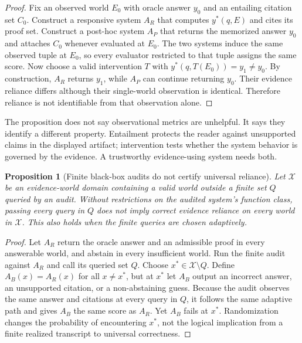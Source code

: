 \documentclass[10pt,twocolumn]{article}
\newtheorem{proposition}{Proposition}
\begin{document}
\begin{proof}
Fix an observed world $E_0$ with oracle answer $y_0$ and an entailing citation set $C_0$. Construct a responsive system $A_R$ that computes $y^*(q,E)$ and cites its proof set. Construct a post-hoc system $A_P$ that returns the memorized answer $y_0$ and attaches $C_0$ whenever evaluated at $E_0$. The two systems induce the same observed tuple at $E_0$, so every evaluator restricted to that tuple assigns the same score. Now choose a valid intervention $T$ with $y^*(q,T(E_0))=y_1\neq y_0$. By construction, $A_R$ returns $y_1$, while $A_P$ can continue returning $y_0$. Their evidence reliance differs although their single-world observation is identical. Therefore reliance is not identifiable from that observation alone.
\end{proof}

The proposition does not say observational metrics are unhelpful. It says they identify a different property. Entailment protects the reader against unsupported claims in the displayed artifact; intervention tests whether the system behavior is governed by the evidence. A trustworthy evidence-using system needs both.

\begin{proposition}[Finite black-box audits do not certify universal reliance]
\label{prop:finite}
Let $\mathcal{X}$ be an evidence-world domain containing a valid world outside a finite set $Q$ queried by an audit. Without restrictions on the audited system's function class, passing every query in $Q$ does not imply correct evidence reliance on every world in $\mathcal{X}$. This also holds when the finite queries are chosen adaptively.
\end{proposition}

\begin{proof}
Let $A_R$ return the oracle answer and an admissible proof in every answerable world, and abstain in every insufficient world. Run the finite audit against $A_R$ and call its queried set $Q$. Choose $x^*\in\mathcal{X}\setminus Q$. Define $A_B(x)=A_R(x)$ for all $x\neq x^*$, but at $x^*$ let $A_B$ output an incorrect answer, an unsupported citation, or a non-abstaining guess. Because the audit observes the same answer and citations at every query in $Q$, it follows the same adaptive path and gives $A_B$ the same score as $A_R$. Yet $A_B$ fails at $x^*$. Randomization changes the probability of encountering $x^*$, not the logical implication from a finite realized transcript to universal correctness.
\end{proof}
\end{document}
